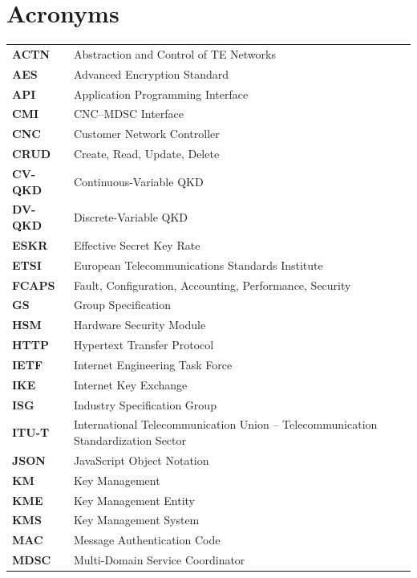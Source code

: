 \section*{Acronyms}

\begin{longtable}{@{}p{2.6cm}p{12.6cm}@{}}
\textbf{ACTN} & Abstraction and Control of TE Networks \\
\textbf{AES} & Advanced Encryption Standard \\
\textbf{API} & Application Programming Interface \\
\textbf{CMI} & CNC--MDSC Interface \\
\textbf{CNC} & Customer Network Controller \\
\textbf{CRUD} & Create, Read, Update, Delete \\
\textbf{CV-QKD} & Continuous-Variable QKD \\
\textbf{DV-QKD} & Discrete-Variable QKD \\
\textbf{ESKR} & Effective Secret Key Rate \\
\textbf{ETSI} & European Telecommunications Standards Institute \\
\textbf{FCAPS} & Fault, Configuration, Accounting, Performance, Security \\
\textbf{GS} & Group Specification \\
\textbf{HSM} & Hardware Security Module \\
\textbf{HTTP} & Hypertext Transfer Protocol \\
\textbf{IETF} & Internet Engineering Task Force \\
\textbf{IKE} & Internet Key Exchange \\
\textbf{ISG} & Industry Specification Group \\
\textbf{ITU-T} & International Telecommunication Union -- Telecommunication Standardization Sector \\
\textbf{JSON} & JavaScript Object Notation \\
\textbf{KM} & Key Management \\
\textbf{KME} & Key Management Entity \\
\textbf{KMS} & Key Management System \\
\textbf{MAC} & Message Authentication Code \\
\textbf{MDSC} & Multi-Domain Service Coordinator \\

\end{longtable}
